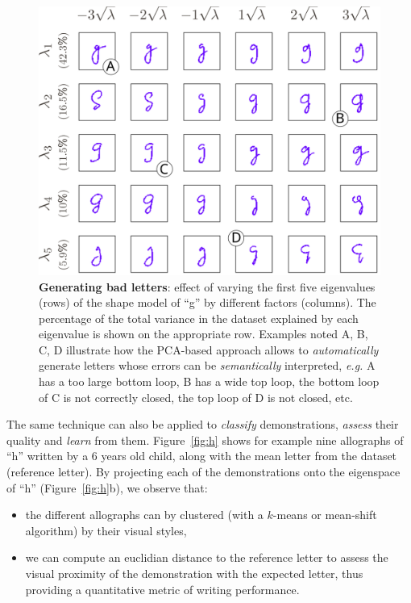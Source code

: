 \documentclass{article}
\newcommand{\eg}{\textit{e.g.}\xspace}
\begin{document}
\begin{figure}
    \centering
    \includegraphics[width=0.9\linewidth]{cowriter-g}
    \caption{\small \label{fig:sampleLetters} \textbf{Generating bad letters}:
        effect of varying the first five eigenvalues (rows) of the shape model
        of ``g'' by different factors (columns). The percentage of the total
        variance in the dataset explained by each eigenvalue is shown      on
        the appropriate row. Examples noted A, B, C, D illustrate how the
        PCA-based approach allows to \emph{automatically} generate letters whose
        errors can be \emph{semantically} interpreted, \eg A has a too large bottom
        loop, B has a wide top loop, the bottom loop of C is not correctly
        closed, the top loop of D is not closed, etc.}

\end{figure}

The same technique can also be applied to \emph{classify} demonstrations,
\emph{assess} their quality and \emph{learn} from them. Figure~\ref{fig:h} shows
for example nine allographs of ``h'' written by a 6 years old child, along with the
mean letter from the dataset (reference letter). By projecting each of the
demonstrations onto the eigenspace of ``h'' (Figure~\ref{fig:h}b), we observe
that:

\begin{itemize}
    \item the different allographs can by clustered (with a $k$-means or
        mean-shift algorithm) by their visual styles,
    \item we can compute an euclidian distance to the reference letter to assess
        the visual proximity of the demonstration with the expected letter, thus
        providing a quantitative metric of writing performance.
\end{itemize}
\end{document}
